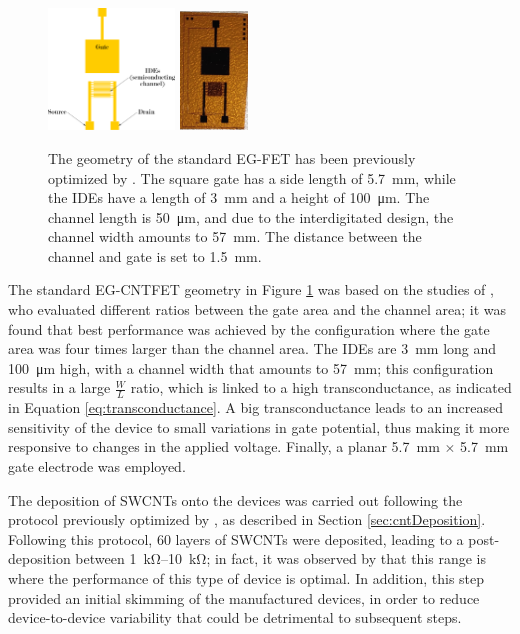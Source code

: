 \begin{figure}
    \centering
    \includegraphics[width=0.3\textwidth]{figures/chapter3/EGFET/standardEGFET_scheme.pdf}
    \quad
    \includegraphics[width=0.16\textwidth]{figures/chapter3/EGFET/standardEGFET.jpg}
    \caption{The geometry of the standard EG-FET has been previously optimized by \citet{joshiUnderstanding2018}. The square gate has a side length of \SI{5.7}{\mm}, while the IDEs have a length of \SI{3}{\mm} and a height of \SI{100}{\um}. The channel length is \SI{50}{\um}, and due to the interdigitated design, the channel width amounts to \SI{57}{\mm}. The distance between the channel and gate is set to \SI{1.5}{\mm}.}
    \label{fig:standardEGFET}
\end{figure}

The standard EG-CNTFET geometry in Figure \ref{fig:standardEGFET} was based on the studies of \citet{joshiUnderstanding2018}, who evaluated different ratios between the gate area and the channel area; it was found that best performance was achieved by the configuration where the gate area was four times larger than the channel area. The IDEs are \SI{3}{\mm} long and \SI{100}{\um} high, with a channel width that amounts to \SI{57}{\mm}; this configuration results in a large $\frac{W}{L}$ ratio, which is linked to a high transconductance, as indicated in Equation \eqref{eq:transconductance}. A big transconductance leads to an increased sensitivity of the device to small variations in gate potential, thus making it more responsive to changes in the applied voltage. Finally, a planar \SI{5.7}{\mm} $\times$ \SI{5.7}{\mm} gate electrode was employed.

The deposition of SWCNTs onto the devices was carried out following the protocol previously optimized by \citet{shkodraOptimization2023}, as described in Section \ref{sec:cntDeposition}. Following this protocol, 60 layers of SWCNTs were deposited, leading to a post-deposition \rds{} between \SIrange{1}{10}{\kohm}; in fact, it was observed by \citet{petrelliMethod2023} that this range is where the performance of this type of device is optimal. In addition, this step provided an initial skimming of the manufactured devices, in order to reduce device-to-device variability that could be detrimental to subsequent steps.

